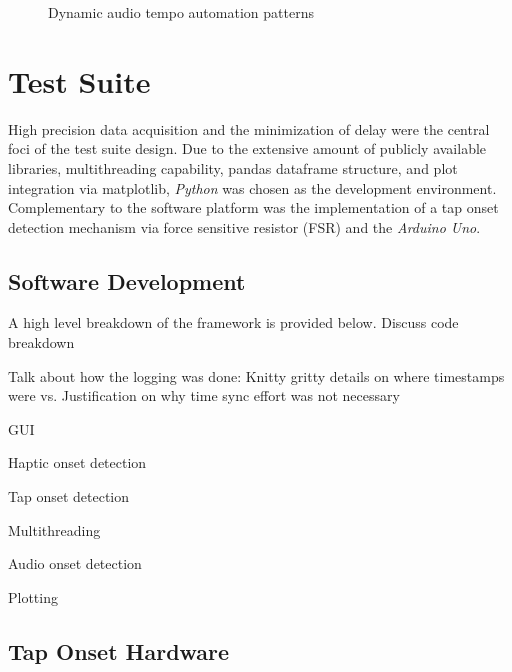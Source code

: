 \begin{figure}[H]
    \centering
    \caption{Dynamic audio tempo automation patterns}
        \qquad
    \label{fig:dynamic_audio}
\end{figure}

\section{Test Suite}
High precision data acquisition and the minimization of delay were the central foci of the test suite design. Due to the extensive amount of publicly available libraries, multithreading capability, pandas dataframe structure, and plot integration via matplotlib, \textit{Python} was chosen as the development environment. Complementary to the software platform was the implementation of a tap onset detection mechanism via force sensitive resistor (FSR) and the \textit{Arduino Uno}. 

\subsection{Software Development} \label{development}
A high level breakdown of the framework is provided below.
            Discuss code breakdown

            Talk about how the logging was done:
                Knitty gritty details on where timestamps were
                vs.
                Justification on why time sync effort was not necessary
            
            GUI
            
            Haptic onset detection
            
            Tap onset detection
            
            Multithreading
            
            Audio onset detection
            
            Plotting

\subsection{Tap Onset Hardware}    \label{tap_arduino}

